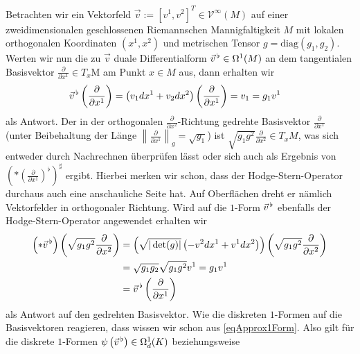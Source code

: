  Betrachten wir ein Vektorfeld \( \vec{v}:= \left[ v^{1}, v^{2} \right]^{T} \in \mathcal{V}^{\infty}(M) \) auf einer zweidimensionalen geschlossenen Riemannschen Mannigfaltigkeit \( M \)
  mit lokalen orthogonalen Koordinaten \( \left( x^{1}, x^{2} \right) \) und metrischen Tensor \( g=\text{diag}(g_{1}, g_{2})\).
  Werten wir nun die zu \( \vec{v} \) duale Differentialform \( \vec{v}^{\,\flat}\in\Omega^{1}(M) \) an dem tangentialen Basisvektor
  \( \frac{\partial}{\partial x^{1}}\in T_{x}\)M am Punkt \( x\in M \) aus,
  dann erhalten wir
  \begin{align}
    \vec{v}^{\,\flat}\left( \frac{\partial}{\partial x^{1}} \right) &= \left( v_{1}dx^{1} + v_{2}dx^{2} \right)\left(\frac{\partial}{\partial x^{1}}  \right)
                                                                   = v_{1} = g_{1}v^{1}
  \end{align}
  als Antwort.
  Der in der orthogonalen \( \frac{\partial}{\partial x^{2}} \)-Richtung gedrehte Basisvektor \( \frac{\partial}{\partial x^{1}} \) 
  (unter Beibehaltung der Länge \( \left\|\frac{\partial}{\partial x^{1}}\right\|_{g} = \sqrt{g_{1}}  \)) ist 
  \( \sqrt{g_{1}g^{2}} \frac{\partial}{\partial x^{2}} \in T_{x}M\), 
  was sich entweder durch Nachrechnen überprüfen lässt oder sich auch als Ergebnis von 
  \( \left( * \left( \frac{\partial}{\partial x^{1}} \right)^{\flat} \right)^{\sharp} \) ergibt.
  Hierbei merken wir schon, dass der Hodge-Stern-Operator durchaus auch eine anschauliche Seite hat.
  Auf Oberflächen dreht er nämlich Vektorfelder in orthogonaler Richtung.
  Wird auf die \( 1\)-Form \( \vec{v}^{\,\flat} \) ebenfalls der Hodge-Stern-Operator angewendet erhalten wir
  \begin{align}
  \begin{aligned}
    \left( *\vec{v}^{\,\flat} \right)\left( \sqrt{g_{1}g^{2}} \frac{\partial}{\partial x^{2}} \right)
                &= \left(\sqrt{|\det(g)|} \left(-v^{2}dx^{1} + v^{1}dx^{2}  \right) \right)\left( \sqrt{g_{1}g^{2}} \frac{\partial}{\partial x^{2}} \right) \\
                &= \sqrt{g_{1}g_{2}} \sqrt{g_{1}g^{2}} v^{1}
                 = g_{1}v^{1} \\
                &= \vec{v}^{\,\flat}\left( \frac{\partial}{\partial x^{1}} \right)
  \end{aligned}
  \end{align}
  als Antwort auf den gedrehten Basisvektor.
  Wie die diskreten \( 1 \)-Formen auf die Basisvektoren reagieren, dass wissen wir schon aus \eqref{eqApprox1Form}.
  Also gilt für die diskrete \( 1 \)-Formen \( \psi\left( \vec{v}^{\,\flat} \right) \in \Omega^{1}_{d}(K)\) beziehungsweise
